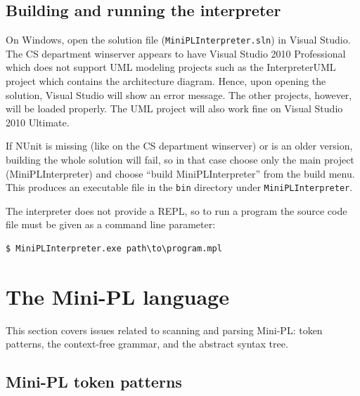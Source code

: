 \documentclass[a4paper,11pt]{article}
\begin{document}
\subsection{Building and running the interpreter}

On Windows, open the solution file (\verb,MiniPLInterpreter.sln,) in Visual Studio. The CS department winserver appears to have Visual Studio 2010 Professional which does not support UML modeling projects such as the InterpreterUML project which contains the architecture diagram. Hence, upon opening the solution, Visual Studio will show an error message. The other projects, however, will be loaded properly. The UML project will also work fine on Visual Studio 2010 Ultimate.

If NUnit is missing (like on the CS department winserver) or is an older version, building the whole solution will fail, so in that case choose only the main project (MiniPLInterpreter) and choose ``build MiniPLInterpreter'' from the build menu. This produces an executable file in the \verb,bin, directory under \verb,MiniPLInterpreter,.

The interpreter does not provide a REPL, so to run a program the source code file must be given as a command line parameter:

\begin{verbatim}
$ MiniPLInterpreter.exe path\to\program.mpl
\end{verbatim}

\newpage
\section{The Mini-PL language}

This section covers issues related to scanning and parsing Mini-PL: token patterns, the context-free grammar, and the abstract syntax tree.

\subsection{Mini-PL token patterns}
\end{document}
